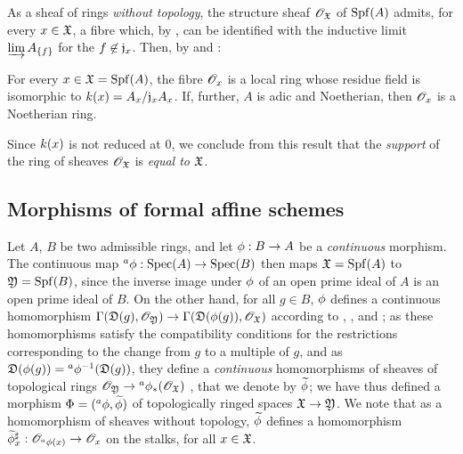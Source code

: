 \begin{env}[10.1.5]
\label{1.10.1.5}
As a sheaf of rings \emph{without topology}, the structure sheaf $\mathscr{O}_\mathfrak{X}$ of ${\mathop{\mathrm{Spf}}\nolimits}(A)$ admits, for every $x\in\mathfrak{X}$, a fibre which, by , can be identified with the inductive limit $\varinjlim A_{\{f\}}$ for the $f\not\in\mathfrak{j}_x$.
Then, by  and :
\end{env}

\begin{prop}[10.1.6]
\label{1.10.1.6}
For every $x\in\mathfrak{X}={\mathop{\mathrm{Spf}}\nolimits}(A)$, the fibre $\mathscr{O}_x$ is a local ring whose residue field is isomorphic to $k(x)=A_x/\mathfrak{j}_xA_x$.
If, further, $A$ is adic and Noetherian, then $\mathscr{O}_x$ is a Noetherian ring.
\end{prop}

Since $k(x)$ is not reduced at $0$, we conclude from this result that the \emph{support} of the ring of sheaves $\mathscr{O}_\mathfrak{X}$ is \emph{equal to $\mathfrak{X}$}.

\subsection{Morphisms of formal affine schemes}
\label{subsection-morphisms-of-formal-affine-schemes}

\begin{env}[10.2.1]
\label{1.10.2.1}
Let $A$, $B$ be two admissible rings, and let $\vphi:B\to A$ be a \emph{continuous} morphism.
The continuous map ${}^a\vphi:\Spec(A)\to\Spec(B)$  then maps $\mathfrak{X}={\mathop{\mathrm{Spf}}\nolimits}(A)$ to $\mathfrak{Y}={\mathop{\mathrm{Spf}}\nolimits}(B)$, since the inverse image under $\phi$ of an open prime ideal of $A$ is an open prime ideal of $B$.
On the other hand, for all $g\in B$, $\phi$ defines a continuous homomorphism $\Gamma(\fk{D}(g),\OO_\fk{Y})\to\Gamma(\fk{D}(\vphi(g)),\OO_\fk{X})$ according to , , and ; as these homomorphisms satisfy the compatibility conditions for the restrictions corresponding to the change from $g$ to a multiple of $g$, and as $\mathfrak{D}(\phi(g))={}^a\phi^{-1}(\mathfrak{D}(g))$, they define a \emph{continuous} homomorphisms of sheaves of topological rings $\OO_\fk{Y}\to{}^a\vphi_*(\OO_\fk{X})$ , that we denote by $\widetilde{\phi}$; we have thus defined a morphism $\Phi=({}^a\phi,\widetilde{\phi})$ of topologically ringed spaces $\fk{X}\to\fk{Y}$.
We note that as a homomorphism of sheaves without topology, $\widetilde{\phi}$ defines a homomorphism $\wt{\vphi}_x^\sharp:\OO_{{}^a\vphi(x)}\to\OO_x$ on the stalks, for all $x\in\mathfrak{X}$.
\end{env}

